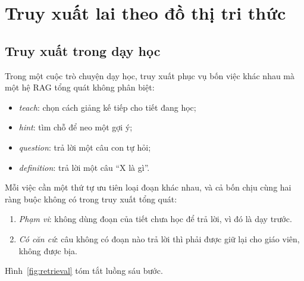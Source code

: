 \section{Truy xuất lai theo đồ thị tri thức}\label{sec:rag}

\subsection{Truy xuất trong dạy học}
Trong một cuộc trò chuyện dạy học, truy xuất phục vụ bốn việc khác nhau mà một hệ RAG tổng quát không phân biệt:
\begin{itemize}
  \item \emph{teach}: chọn cách giảng kế tiếp cho tiết đang học;
  \item \emph{hint}: tìm chỗ để neo một gợi ý;
  \item \emph{question}: trả lời một câu con tự hỏi;
  \item \emph{definition}: trả lời một câu ``X là gì''.
\end{itemize}
Mỗi việc cần một thứ tự ưu tiên loại đoạn khác nhau, và cả bốn chịu cùng hai ràng buộc không có trong truy xuất tổng quát:
\begin{enumerate}[label=(\roman*)]
  \item \emph{Phạm vi}: không dùng đoạn của tiết chưa học để trả lời, vì đó là dạy trước.
  \item \emph{Có căn cứ}: câu không có đoạn nào trả lời thì phải được giữ lại cho giáo viên, không được bịa.
\end{enumerate}
Hình~\ref{fig:retrieval} tóm tắt luồng sáu bước.

